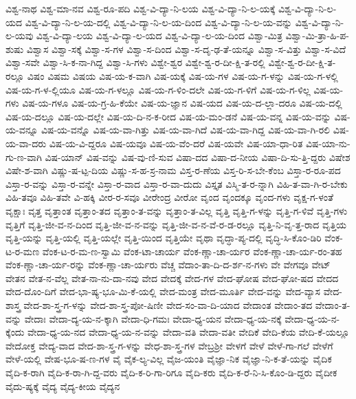 {ವಿಶ್ವ-ನಾಥ
ವಿಶ್ವ-ಮಾ-ನವ
ವಿಶ್ವ-ರೂ-ಪದಿ
ವಿಶ್ವ-ವಿ-ದ್ಯಾ-ನಿ-ಲಯ
ವಿಶ್ವ-ವಿ-ದ್ಯಾ-ನಿ-ಲ-ಯಕ್ಕೆ
ವಿಶ್ವ-ವಿ-ದ್ಯಾ-ನಿ-ಲ-ಯದ
ವಿಶ್ವ-ವಿ-ದ್ಯಾ-ನಿ-ಲ-ಯ-ದಲ್ಲಿ
ವಿಶ್ವ-ವಿ-ದ್ಯಾ-ನಿ-ಲ-ಯ-ದಿಂದ
ವಿಶ್ವ-ವಿ-ದ್ಯಾ-ನಿ-ಲ-ಯ-ವನ್ನು
ವಿಶ್ವ-ವಿ-ದ್ಯಾ-ನಿ-ಲ-ಯವು
ವಿಶ್ವ-ವಿ-ದ್ಯಾ-ಲಯ
ವಿಶ್ವ-ವಿ-ದ್ಯಾ-ಲ-ಯದ
ವಿಶ್ವ-ವಿ-ದ್ಯಾ-ಲ-ಯ-ದಿಂದ
ವಿಶ್ವಾ-ಮಿತ್ರ
ವಿಶ್ವಾ-ಮಿ-ತ್ರಾ-ಹಿ-ಪ-ಶುಷು
ವಿಶ್ವಾಸ
ವಿಶ್ವಾ-ಸಕ್ಕೆ
ವಿಶ್ವಾ-ಸ-ಗಳ
ವಿಶ್ವಾ-ಸ-ದಿಂದ
ವಿಶ್ವಾ-ಸ-ದೃ-ಢ-ತೆ-ಯನ್ನೂ
ವಿಶ್ವಾ-ಸ-ವಿತ್ತು
ವಿಶ್ವಾ-ಸ-ವಿದೆ
ವಿಶ್ವಾ-ಸವೇ
ವಿಶ್ವಾ-ಸಿ-ಕ-ನಾ-ಗಿದ್ದ
ವಿಶ್ವಾ-ಸಿ-ಗಳು
ವಿಶ್ವೇ-ಶ್ವರ
ವಿಶ್ವೇ-ಶ್ವ-ರ-ದೀ-ಕ್ಷಿ-ತ-ರಲ್ಲಿ
ವಿಶ್ವೇ-ಶ್ವ-ರ-ದೀ-ಕ್ಷಿ-ತ-ರಲ್ಲೂ
ವಿಷಂ
ವಿಷಮ
ವಿಷಯ
ವಿಷ-ಯ-ಕ-ವಾಗಿ
ವಿಷ-ಯಕ್ಕೆ
ವಿಷ-ಯ-ಗಳ
ವಿಷ-ಯ-ಗ-ಳನ್ನು
ವಿಷ-ಯ-ಗ-ಳಲ್ಲಿ
ವಿಷ-ಯ-ಗ-ಳ-ಲ್ಲಿಯೂ
ವಿಷ-ಯ-ಗ-ಳಲ್ಲೂ
ವಿಷ-ಯ-ಗ-ಳಿಂ-ದಲೇ
ವಿಷ-ಯ-ಗ-ಳಿಗೆ
ವಿಷ-ಯ-ಗ-ಳಿಲ್ಲ
ವಿಷ-ಯ-ಗಳು
ವಿಷ-ಯ-ಗಳೂ
ವಿಷ-ಯ-ಗ್ರ-ಹಿ-ಕೆಯೇ
ವಿಷ-ಯ-ಜ್ಞಾನ
ವಿಷ-ಯದ
ವಿಷ-ಯ-ದ-ಲ್ಲಾ-ದರೂ
ವಿಷ-ಯ-ದಲ್ಲಿ
ವಿಷ-ಯ-ದಲ್ಲೂ
ವಿಷ-ಯ-ದಲ್ಲೇ
ವಿಷ-ಯ-ದಿ-ನ-ಕ-ರೀದ
ವಿಷ-ಯ-ಮಂ-ಡನೆ
ವಿಷ-ಯ-ವನ್ನ
ವಿಷ-ಯ-ವನ್ನು
ವಿಷ-ಯ-ವನ್ನೂ
ವಿಷ-ಯ-ವನ್ನೊ
ವಿಷ-ಯ-ವಾ-ಗಿತ್ತು
ವಿಷ-ಯ-ವಾ-ಗಿದೆ
ವಿಷ-ಯ-ವಾ-ಗಿದ್ದ
ವಿಷ-ಯ-ವಾ-ಗಿ-ರಲಿ
ವಿಷ-ಯ-ವಾ-ದರು
ವಿಷ-ಯ-ವಿ-ದ್ದರೂ
ವಿಷ-ಯವೂ
ವಿಷ-ಯ-ವೆಂ-ದರೆ
ವಿಷ-ಯವೇ
ವಿಷ-ಯಾ-ಧಾ-ರಿತ
ವಿಷ-ಯಾ-ನು-ಗು-ಣ-ವಾಗಿ
ವಿಷ-ಯಾನ್
ವಿಷ-ವನ್ನು
ವಿಷ-ವು-ಣಿ-ಸುವ
ವಿಷಾ-ದದ
ವಿಷಾ-ದ-ನೀಯ
ವಿಷಾ-ದಿ-ಸು-ತ್ತಿ-ದ್ದರು
ವಿಷೇಶ
ವಿಷೇ-ಶ-ವಾಗಿ
ವಿಷ್ಣು-ಷ-ಟ್ಪ-ದಿಯ
ವಿಷ್ಣು-ಸ-ಹ-ಸ್ರ-ನಾಮ
ವಿಸ್ತ-ರ-ಣೆಯ
ವಿಸ್ತ-ರಿ-ಸ-ಬೇ-ಕೆಂಬ
ವಿಸ್ತಾ-ರ-ರೂ-ಪದ
ವಿಸ್ತಾ-ರ-ವನ್ನು
ವಿಸ್ತಾ-ರ-ವನ್ನೇ
ವಿಸ್ತಾ-ರ-ವಾದ
ವಿಸ್ತಾ-ರ-ವಾ-ದುದು
ವಿಸ್ತೃತ
ವಿಸ್ಮಿ-ತ-ರ-ನ್ನಾಗಿ
ವಿಹಿ-ತ-ವಾ-ಗಿ-ರ-ಬೇಕು
ವಿಹಿ-ತವೂ
ವಿಹಿ-ತವೇ
ವಿ-ಹಕ್ಕಿ
ವೀರ-ರ-ಸವೂ
ವೀರೇಂದ್ರ
ವೀರೋ
ವೃಂದ
ವೃಂದಕ್ಕೂ
ವೃಂದ-ಗಳು
ವೃಕ್ಷ-ಗ-ಳಂತೆ
ವೃಕ್ಷಾಃ
ವೃತ್ತ
ವೃತ್ತಾಂತ
ವೃತ್ತಾಂ-ತದ
ವೃತ್ತಾಂ-ತ-ವನ್ನು
ವೃತ್ತಾಂ-ತ-ವಿಲ್ಲ
ವೃತ್ತಿ
ವೃತ್ತಿ-ಗ-ಳನ್ನು
ವೃತ್ತಿ-ಗ-ಳಿವೆ
ವೃತ್ತಿ-ಗಳು
ವೃತ್ತಿಗೆ
ವೃತ್ತಿ-ಜೀ-ವ-ನ-ದಿಂದ
ವೃತ್ತಿ-ಜೀ-ವ-ನ-ವನ್ನು
ವೃತ್ತಿ-ಜೀ-ವ-ನ-ವೆ-ರ-ಡ-ರಲ್ಲೂ
ವೃತ್ತಿ-ನಿ-ವೃ-ತ್ತ-ರಾದ
ವೃತ್ತಿಯ
ವೃತ್ತಿ-ಯನ್ನು
ವೃತ್ತಿ-ಯಲ್ಲಿ
ವೃತ್ತಿ-ಯಲ್ಲೇ
ವೃತ್ತಿ-ಯಿಂದ
ವೃತ್ತಿಯೇ
ವೃಥಾ
ವೃದ್ಧಾ-ಪ್ಯ-ದಲ್ಲಿ
ವೃದ್ಧಿ-ಸಿ-ಕೊಂ-ಡಿರಿ
ವೆಂಕ-ಟ-ರ-ಮಣ
ವೆಂಕ-ಟ-ರ-ಮ-ಣ-ಸ್ವಾಮಿ
ವೆಂಕ-ಟಾ-ಚಾರ್ಯ
ವೆಂಕ-ಣ್ಣಾ-ಚಾ-ರ್ಯರ
ವೆಂಕ-ಣ್ಣಾ-ಚಾ-ರ್ಯ-ರಂ-ತಹ
ವೆಂಕ-ಣ್ಣಾ-ಚಾ-ರ್ಯ-ರನ್ನು
ವೆಂಕ-ಣ್ಣಾ-ಚಾ-ರ್ಯರು
ವೆಚ್ಚ
ವೆದಾಂ-ತಾ-ದಿ-ದ-ರ್ಶ-ನ-ಗಳು
ವೇ
ವೇಗವೂ
ವೇಟ್
ವೇತನ
ವೇತ-ನ-ವೆಲ್ಲ
ವೇತ-ನಾ-ನು-ದಾ-ನವು
ವೇದ
ವೇದಕ್ಕೆ
ವೇದ-ಗಳ
ವೇದ-ಘೋಷ
ವೇದ-ಘೋ-ಷದ
ವೇದದ
ವೇದ-ದೊಂ-ದಿಗೆ
ವೇದ-ಭಾ-ಷ್ಯ-ಭೂ-ಮಿ-ಕೆ-ಯಲ್ಲಿ
ವೇದ-ಮಂತ್ರ
ವೇದ-ಮೂರ್ತಿ
ವೇದ-ವನ್ನು
ವೇದ-ವ್ಯಾಸ
ವೇದ-ಶಾಸ್ತ್ರ
ವೇದ-ಶಾ-ಸ್ತ್ರ-ಗ-ಳನ್ನು
ವೇದ-ಶಾ-ಸ್ತ್ರ-ಪೋ-ಷಿಣೀ
ವೇದ-ಸಂ-ವಾ-ದಿ-ಯಾದ
ವೇದಾಂತ
ವೇದಾಂ-ತದ
ವೇದಾಂ-ತ-ವನ್ನು
ವೇದಾಃ
ವೇದಾ-ದ್ಯ-ಯ-ನ-ಕ್ಕಾಗಿ
ವೇದಾ-ಧಿ-ಗಮಃ
ವೇದಾ-ಧ್ಯ-ಯನ
ವೇದಾ-ಧ್ಯ-ಯ-ನಕ್ಕೆ
ವೇದಾ-ಧ್ಯ-ಯ-ನ-ಕ್ಕೆಂದು
ವೇದಾ-ಧ್ಯ-ಯ-ನದ
ವೇದಾ-ಧ್ಯ-ಯ-ನ-ವನ್ನು
ವೇದಾ-ವತಿ
ವೇದಾ-ವತೀ
ವೇದಿಕೆ
ವೇದಿ-ಕೆಯ
ವೇದಿ-ಕೆ-ಯಲ್ಲೂ
ವೇದೋಕ್ತ
ವೇದ್ಯ-ವಾದ
ವೇದ-ಶಾ-ಸ್ತ್ರ-ಗ-ಳನ್ನು
ವೇಧ-ಶಾ-ಸ್ತ್ರ-ಗಳ
ವೇಬ್ರಶ್ರೀ
ವೇಳಗೆ
ವೇಳೆ
ವೇಳೆ-ಗಾ-ಗಲೆ
ವೇಳೆಗೆ
ವೇಳೆ-ಯಲ್ಲಿ
ವೇಷ-ಭೂ-ಷ-ಣ-ಗಳ
ವೈ
ವೈಕ-ಲ್ಯ-ವಿಲ್ಲ
ವೈಜ-ಯಂತಿ
ವೈಜ್ಞಾ-ನಿಕ
ವೈಜ್ಞಾ-ನಿ-ಕ-ತೆ-ಯನ್ನು
ವೈದಿಕ
ವೈದಿ-ಕ-ರಾಗಿ
ವೈದಿ-ಕ-ರಾ-ಗಿ-ದ್ದ-ವರು
ವೈದಿ-ಕ-ರಿ-ಗಾ-ರಿಗೂ
ವೈದಿ-ಕರು
ವೈದಿ-ಕ-ರೆ-ನಿ-ಸಿ-ಕೊಂ-ಡಿ-ದ್ದರು
ವೈದೀಕ
ವೈದು-ಷ್ಯಕ್ಕೆ
ವೈದ್ಯ
ವೈದ್ಯ-ಕೀಯ
ವೈದ್ಯನ
}
